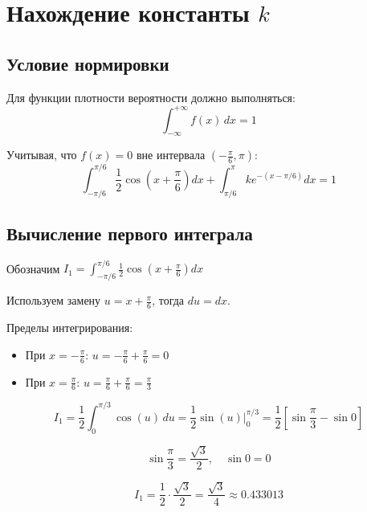 \documentclass[12pt,a4paper]{article}
\begin{document}
\section{Нахождение константы $k$}

\subsection*{Условие нормировки}

Для функции плотности вероятности должно выполняться:
\begin{equation}
\int_{-\infty}^{+\infty} f(x)\,dx = 1
\end{equation}

Учитывая, что $f(x) = 0$ вне интервала $\left(-\frac{\pi}{6}, \pi\right)$:
\begin{equation}
\int_{-\pi/6}^{\pi/6} \frac{1}{2}\cos\left(x+\frac{\pi}{6}\right)dx + \int_{\pi/6}^{\pi} ke^{-(x-\pi/6)}dx = 1
\end{equation}

\subsection*{Вычисление первого интеграла}

Обозначим $I_1 = \displaystyle\int_{-\pi/6}^{\pi/6} \frac{1}{2}\cos\left(x+\frac{\pi}{6}\right)dx$

Используем замену $u = x + \frac{\pi}{6}$, тогда $du = dx$.

Пределы интегрирования:
\begin{itemize}
    \item При $x = -\frac{\pi}{6}$: $u = -\frac{\pi}{6} + \frac{\pi}{6} = 0$
    \item При $x = \frac{\pi}{6}$: $u = \frac{\pi}{6} + \frac{\pi}{6} = \frac{\pi}{3}$
\end{itemize}

\begin{equation}
I_1 = \frac{1}{2}\int_{0}^{\pi/3} \cos(u)\,du = \frac{1}{2}\sin(u)\Big|_{0}^{\pi/3} = \frac{1}{2}\left[\sin\frac{\pi}{3} - \sin 0\right]
\end{equation}

\begin{equation}
\sin\frac{\pi}{3} = \frac{\sqrt{3}}{2}, \quad \sin 0 = 0
\end{equation}

\begin{equation}
I_1 = \frac{1}{2} \cdot \frac{\sqrt{3}}{2} = \frac{\sqrt{3}}{4} \approx 0.433013
\end{equation}
\end{document}
